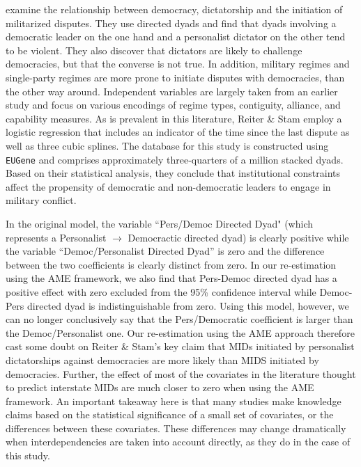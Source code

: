 \citet{reiter:stam:2003} examine the relationship between democracy, dictatorship and the initiation of militarized disputes.  They use directed dyads and find that dyads involving a democratic leader on the one hand and a personalist dictator on the other tend to be violent. They also discover that dictators are likely to challenge democracies, but that the converse is not true.  In addition, military regimes and single-party regimes are more prone to initiate disputes with democracies, than the other way around. Independent variables are largely taken from an earlier study and focus on various encodings of regime types, contiguity, alliance, and capability measures. As is prevalent in this literature, Reiter \& Stam employ a logistic regression that includes an indicator of the time since the last dispute as well as three cubic splines. The database for this study is constructed using \texttt{EUGene} \citep{bennett:stam:2000} and comprises approximately three-quarters of a million stacked dyads. Based on their statistical analysis, they conclude that institutional constraints affect the propensity of democratic and non-democratic leaders to engage in military conflict. 

In the original model, the variable ``Pers/Democ Directed Dyad" (which represents a Personalist $\rightarrow$ Democractic directed dyad) is clearly positive while the variable ``Democ/Personalist Directed Dyad'' is zero and the difference between the two coefficients is clearly distinct from zero. In our re-estimation using the AME framework, we also find that Pers-Democ directed dyad has a positive effect with zero excluded from the 95\% confidence interval while Democ-Pers directed dyad is indistinguishable from zero. Using this model, however, we can no longer conclusively say that the Pers/Democratic coefficient is larger than the Democ/Personalist one. Our re-estimation using the AME approach therefore cast some doubt on Reiter \& Stam's key claim that MIDs initiated by personalist dictatorships against democracies are more likely than MIDS initiated by democracies. Further, the effect of most of the covariates in the literature thought to predict interstate MIDs are much closer to zero when using the AME framework. An important takeaway here is that many studies make knowledge claims based on the statistical significance of a small set of covariates, or the differences between these covariates. These differences may change dramatically when interdependencies are taken into account directly, as they do in the case of this study.

